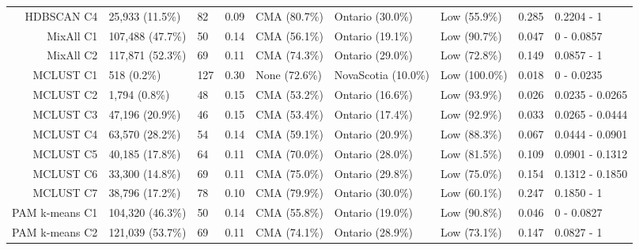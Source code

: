 \documentclass[11pt, a4paper]{article}
\begin{document}
\begin{table}[H]
{\begin{tabular}{|r|llllllll|}
\rowcolor{gray!25}  HDBSCAN C4 & 25,933 (11.5\%) & 82 & 0.09 & CMA (80.7\%) & Ontario (30.0\%) & Low (55.9\%) & 0.285 & 0.2204 - 1 \\ 
  MixAll C1 & 107,488 (47.7\%) & 50 & 0.14 & CMA (56.1\%) & Ontario (19.1\%) & Low (90.7\%) & 0.047 & 0 - 0.0857 \\ 
  MixAll C2 & 117,871 (52.3\%) & 69 & 0.11 & CMA (74.3\%) & Ontario (29.0\%) & Low (72.8\%) & 0.149 & 0.0857 - 1 \\ 
 \rowcolor{gray!25} MCLUST C1 & 518 (0.2\%) & 127 & 0.30 & None (72.6\%) & NovaScotia (10.0\%) & Low (100.0\%) & 0.018 & 0 - 0.0235 \\ 
\rowcolor{gray!25}  MCLUST C2 & 1,794 (0.8\%) & 48 & 0.15 & CMA (53.2\%) & Ontario (16.6\%) & Low (93.9\%) & 0.026 & 0.0235 - 0.0265 \\ 
\rowcolor{gray!25}  MCLUST C3 & 47,196 (20.9\%) & 46 & 0.15 & CMA (53.4\%) & Ontario (17.4\%) & Low (92.9\%) & 0.033 & 0.0265 - 0.0444 \\ 
\rowcolor{gray!25}  MCLUST C4 & 63,570 (28.2\%) & 54 & 0.14 & CMA (59.1\%) & Ontario (20.9\%) & Low (88.3\%) & 0.067 & 0.0444 - 0.0901 \\ 
\rowcolor{gray!25}  MCLUST C5 & 40,185 (17.8\%) & 64 & 0.11 & CMA (70.0\%) & Ontario (28.0\%) & Low (81.5\%) & 0.109 & 0.0901 - 0.1312 \\ 
 \rowcolor{gray!25} MCLUST C6 & 33,300 (14.8\%) & 69 & 0.11 & CMA (75.0\%) & Ontario (29.8\%) & Low (75.0\%) & 0.154 & 0.1312 - 0.1850 \\ 
\rowcolor{gray!25}  MCLUST C7 & 38,796 (17.2\%) & 78 & 0.10 & CMA (79.9\%) & Ontario (30.0\%) & Low (60.1\%) & 0.247 & 0.1850 - 1 \\ 
  PAM k-means C1 & 104,320 (46.3\%) & 50 & 0.14 & CMA (55.8\%) & Ontario (19.0\%) & Low (90.8\%) & 0.046 & 0 - 0.0827 \\ 
  PAM k-means C2 & 121,039 (53.7\%) & 69 & 0.11 & CMA (74.1\%) & Ontario (28.9\%) & Low (73.1\%) & 0.147 & 0.0827 - 1 \\ 
   \hline
\end{tabular}}
\end{table}
\end{document}
